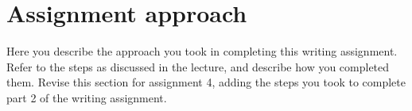 \documentclass[a4paper,12pt]{article}
\begin{document}
\section{Assignment approach}
Here you describe the approach you took in completing this writing assignment. Refer to the steps as discussed in the lecture, and describe how you completed them. Revise this section for assignment 4, adding the steps you took to complete part 2 of the writing assignment. 



\end{document}
